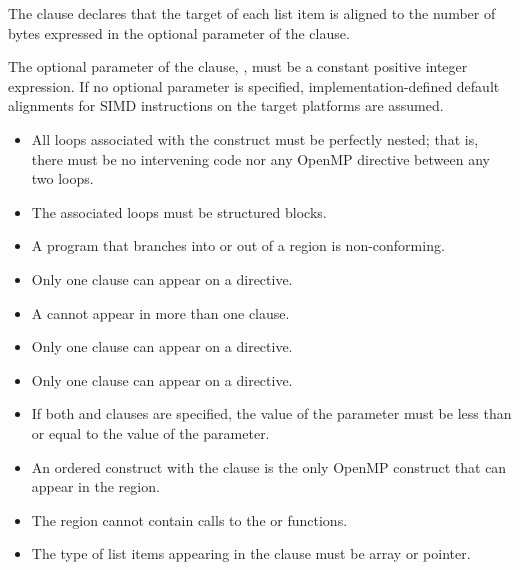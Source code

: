 \fortranspecificstart
The  clause declares that the target of each list item is aligned to the number 
of bytes expressed in the optional parameter of the  clause.
\fortranspecificend

The optional parameter of the  clause, , must be a constant positive 
integer expression. If no optional parameter is specified, implementation-defined default 
alignments for SIMD instructions on the target platforms are assumed.

\restrictions
\begin{itemize}
\item All loops associated with the construct must be perfectly nested; that is, there must be 
no intervening code nor any OpenMP directive between any two loops.

\item The associated loops must be structured blocks.

\item A program that branches into or out of a  region is non-conforming. 

\item Only one  clause can appear on a  directive.

\item A  cannot appear in more than one  clause.

\item Only one  clause can appear on a  directive.

\item Only one  clause can appear on a  directive.

\item If both  and  clauses are specified, the value of the  parameter must be less than or equal to the value of the  parameter.

\item An ordered construct with the  clause is the only OpenMP construct that can appear in the  region. 

\ccppspecificstart
\item The  region cannot contain calls to the  or  functions. 
\ccppspecificend
\bigskip

\cspecificstart
\item The type of list items appearing in the  clause must be array or pointer.
\cspecificend


\end{itemize}
